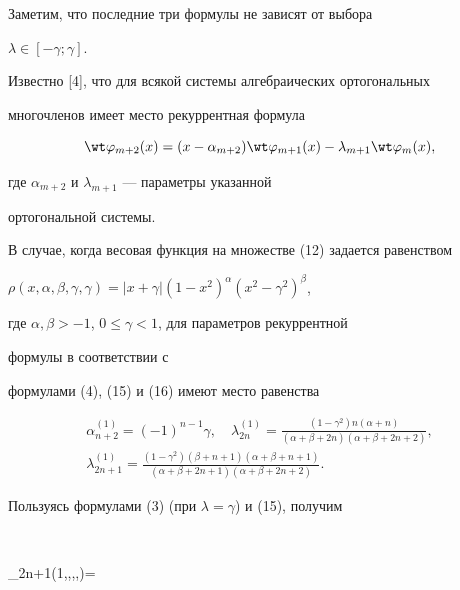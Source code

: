 Заметим, что последние три формулы не зависят от выбора 


$\lambda\in[-\gamma;\gamma]$. 


 


Известно [4], что для всякой системы алгебраических ортогональных 


многочленов имеет место рекуррентная формула 


\begin{equation} 


\wt\varphi_{m+2}(x)=(x-\alpha_{m+2})\wt\varphi_{m+1}(x)- 


\lambda_{m+1}\wt\varphi_m(x), 


\end{equation} 


где $\alpha_{m+2}$ и $\lambda_{m+1}$ --- параметры указанной 


ортогональной системы. 


 


В случае, когда весовая функция на множестве (12) задается равенством 


$\rho(x,\alpha,\beta,\gamma,\gamma)=|x+\gamma|(1-x^2)^\alpha 


(x^2-\gamma^2)^\beta$, 


где $\alpha,\beta>-1$, $0\le\gamma<1$, для параметров рекуррентной 


формулы в соответствии с 


формулами (4), (15) и (16) имеют место равенства 


\begin{gather*} 


\alpha^{(1)}_{n+2}=(-1)^{n-1}\gamma,\quad 


\lambda^{(1)}_{2n}=\frac{(1-\gamma^2)n(\alpha+n)} 


{(\alpha+\beta+2n)(\alpha+\beta+2n+2)},\\


\lambda^{(1)}_{2n+1}= 


\frac{(1-\gamma^2)(\beta+n+1)(\alpha+\beta+n+1)} 


{(\alpha+\beta+2n+1)(\alpha+\beta+2n+2)}. 


\end{gather*}  


Пользуясь формулами (3) (при $\lambda=\gamma$) и (15), получим 


$$ 


\wt\varphi_{2n+1}(1,\alpha,\beta,\gamma,\gamma)= 


